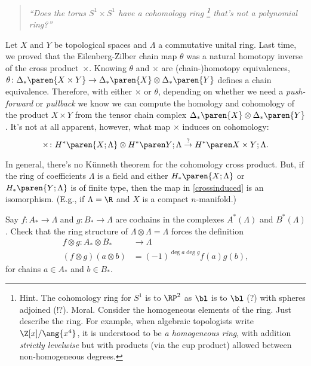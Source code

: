 \begin{quote}
    \textit{``Does the torus $S^1 \times S^1$ have a cohomology ring%
        \footnote{\textsf{Hint.} The cohomology ring for $S^1$ is to $\RP^2$ as $\bl$ is to $\bl$ (?) with spheres adjoined (!?). \textsf{Moral.} Consider the homogeneous elements of the ring. Just describe the ring. For example, when algebraic topologists write $\Z[x]/\ang{x^4}$, it is understood to be \emph{a homogeneous ring}, with addition \emph{strictly levelwise} but with products (via the cup product) allowed between non-homogeneous degrees.}%
    that's not a polynomial ring?''}
\end{quote}

Let $X$ and $Y$ be topological spaces and $\Lambda$ a commutative unital ring. 
Last time, we proved that the Eilenberg-Zilber chain map $\theta$ was a natural homotopy inverse of the cross product~$\times$. 
Knowing $\theta$ and $\times$ are (chain-)homotopy equivalences, $\theta \colon {\Delta}_{*}\paren{X \times Y} \to {\Delta}_{*}\paren{X} \otimes {\Delta}_{*}\paren{Y}$ defines a chain equivalence.
Therefore, with either $\times$ or $\theta$, depending on whether we need a \emph{push-forward} or \emph{pullback} we know we can compute the homology and cohomology of the product $X \times Y$ from the tensor chain complex ${\Delta}_{*}\paren{X} \otimes {\Delta}_{*}\paren{Y}$. 
It's not at all apparent, however, what map $\times$ induces on cohomology:
\begin{equation}
    \label{crossinduced}
    \times \colon H^*\paren{ X; \Lambda } \otimes \coho{Y}{\Lambda} \overset{?}{\to} \coho{X\times Y}{\Lambda}.
\end{equation}

\begin{note}[]
    In general, there's no Künneth theorem for the cohomology cross product. 
    But, if the ring of coefficients $\Lambda$ is a field and either ${H}_{*}\paren{X;\Lambda}$ or ${H}_{*}\paren{Y;\Lambda}$ is of finite type, then the map in \eqref{crossinduced} is an isomorphism. 
    (E.g., if $\Lambda = \R$ and $X$ is a compact $n$-manifold.)
\end{note}

\begin{todo}[]
    Say $f\colon A_* \to \Lambda$ and $g\colon B_* \to \Lambda$ are cochains in the complexes $A^*(\Lambda)$ and $B^*(\Lambda)$. 
    Check that the ring structure of $\Lambda \otimes \Lambda = \Lambda$ forces the definition
    \begin{align*}
        f \otimes g \colon  A_* \otimes B_* & \to \Lambda\\
        (f \otimes g)(a \otimes b) &= (-1)^{\deg a \deg g} f(a) g(b),
    \end{align*}
    for chains $a \in A_*$ and $b \in B_*$.
\end{todo}


